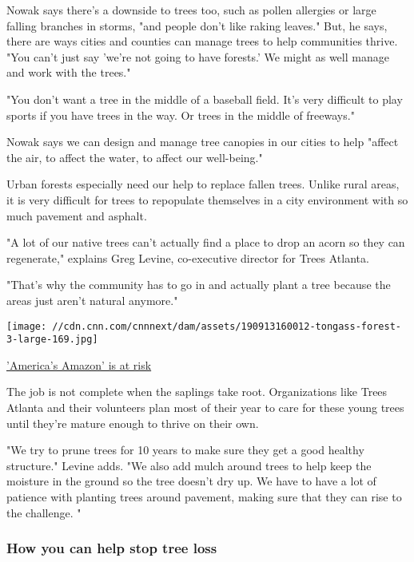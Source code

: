 Nowak says there's a downside to trees too, such as pollen allergies or
large falling branches in storms, "and people don't like raking leaves."
But, he says, there are ways cities and counties can manage trees to
help communities thrive. "You can't just say 'we're not going to have
forests.' We might as well manage and work with the trees."

"You don't want a tree in the middle of a baseball field. It's very
difficult to play sports if you have trees in the way. Or trees in the
middle of freeways."

Nowak says we can design and manage tree canopies in our cities to help
"affect the air, to affect the water, to affect our well-being."

Urban forests especially need our help to replace fallen trees. Unlike
rural areas, it is very difficult for trees to repopulate themselves in
a city environment with so much pavement and asphalt.

"A lot of our native trees can't actually find a place to drop an acorn
so they can regenerate," explains Greg Levine, co-executive director for
Trees Atlanta.

"That's why the community has to go in and actually plant a tree because
the areas just aren't natural anymore."

\href{/2019/09/13/politics/alaska-trump-tongass-forest-weir-wxc/index.html}{}

\texttt{[image: //cdn.cnn.com/cnnnext/dam/assets/190913160012-tongass-forest-3-large-169.jpg]}

\href{/2019/09/13/politics/alaska-trump-tongass-forest-weir-wxc/index.html}{'America's
Amazon' is at risk}

The job is not complete when the saplings take root. Organizations like
Trees Atlanta and their volunteers plan most of their year to care for
these young trees until they're mature enough to thrive on their own.

"We try to prune trees for 10 years to make sure they get a good healthy
structure." Levine adds. "We also add mulch around trees to help keep
the moisture in the ground so the tree doesn't dry up. We have to have a
lot of patience with planting trees around pavement, making sure that
they can rise to the challenge. "

\hypertarget{how-you-can-help-stop-tree-loss}{%
\subsubsection{How you can help stop tree
loss}\label{how-you-can-help-stop-tree-loss}}

